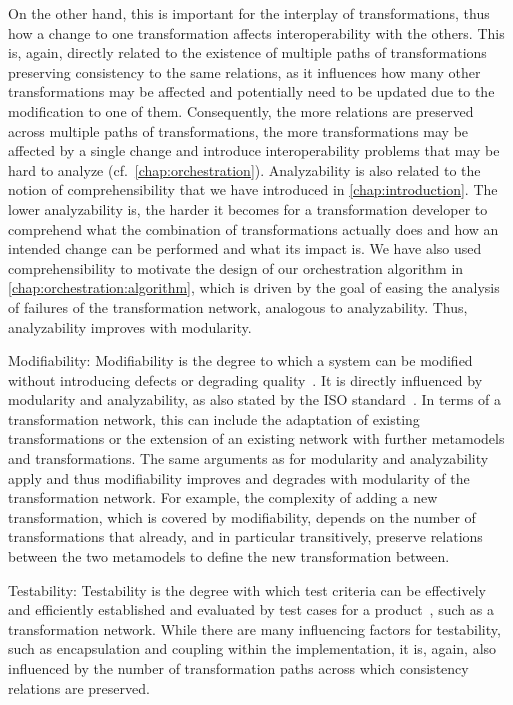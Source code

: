\begin{properdescription}
    On the other hand, this is important for the interplay of transformations, thus how a change to one transformation affects interoperability with the others.
    This is, again, directly related to the existence of multiple paths of transformations preserving consistency to the same relations, as it influences how many other transformations may be affected and potentially need to be updated due to the modification to one of them.
    Consequently, the more relations are preserved across multiple paths of transformations, the more transformations may be affected by a single change and introduce interoperability problems that may be hard to analyze (cf.\ \autoref{chap:orchestration}).
    Analyzability is also related to the notion of comprehensibility that we have introduced in \autoref{chap:introduction}. The lower analyzability is, the harder it becomes for a transformation developer to comprehend what the combination of transformations actually does and how an intended change can be performed and what its impact is.
    We have also used comprehensibility to motivate the design of our orchestration algorithm in \autoref{chap:orchestration:algorithm}, which is driven by the goal of easing the analysis of failures of the transformation network, analogous to analyzability.
    Thus, analyzability improves with modularity.
    \item[Modifiability:]
    Modifiability is the degree to which a system can be modified without introducing defects or degrading quality~\cite[p.~15]{iso25010}.
    It is directly influenced by modularity and analyzability, as also stated by the ISO standard~\cite[p.~15]{iso25010}.
    In terms of a transformation network, this can include the adaptation of existing transformations or the extension of an existing network with further metamodels and transformations.
    The same arguments as for modularity and analyzability apply and thus modifiability improves and degrades with modularity of the transformation network.
    For example, the complexity of adding a new transformation, which is covered by modifiability, depends on the number of transformations that already, and in particular transitively, preserve relations between the two metamodels to define the new transformation between.
    \item[Testability:]
    Testability is the degree with which test criteria can be effectively and efficiently established and evaluated by test cases for a product~\cite[p.~15]{iso25010}, such as a transformation network.
    While there are many influencing factors for testability, such as encapsulation and coupling within the implementation, it is, again, also influenced by the number of transformation paths across which consistency relations are preserved.

\end{properdescription}
